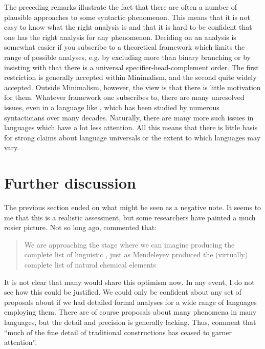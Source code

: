 \documentclass[output=paper]{langsci/langscibook}
\begin{document}
The preceding remarks illustrate the fact that there are often a number of
plausible approaches to some syntactic phenomenon. This means that it is not
easy to know what the right analysis is and that it is hard to be confident
that one has the right analysis for any phenomenon. Deciding on an analysis is
somewhat easier if you subscribe to a theoretical framework which limits the
range of possible analyses, e.g. by excluding more than binary branching or by
insisting with \citet{Kayne1994} that there is a universal
specifier-head-complement order. The first restriction is generally accepted
within Minimalism, and the second quite widely accepted. Outside Minimalism,
however, the view is that there is little motivation for them. Whatever
framework one subscribes to, there are many unresolved issues, even in a
language like , which has been studied by numerous syntacticians over
many decades. Naturally, there are many more such issues in languages which
have a lot less attention. All this means that there is little basis for strong
claims about language universals or the extent to which languages may vary.

\section{Further discussion}\label{sec-5:5}

The previous section ended on what might be seen as a negative note. It seems
to me that this is a realistic assessment, but some researchers have painted a
much rosier picture. Not so long ago, \citet{Baker2001} commented that:
\blockquote[{\citealt[50]{Baker2001}}]{We are approaching the stage where we can
imagine producing the complete list of linguistic , just as
Mendeleyev produced the (virtually) complete list of natural chemical
elements}. It is not clear that many would share this optimism now. In any
event, I do not see how this could be justified. We could only be confident
about any set of proposals about  if we had detailed formal analyses
for a wide range of languages employing them. There are of course proposals
about many phenomena in many languages, but the detail and precision is
generally lacking. Thus, \citet[535]{CulJac2005} comment that \enquote{much of
the fine detail of traditional constructions has ceased to garner attention}.
\end{document}
